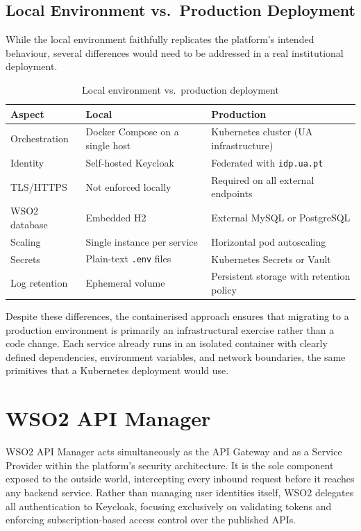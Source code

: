 \documentclass[12pt, a4paper]{report}
\begin{document}
\subsection{Local Environment vs.\ Production Deployment}
While the local environment faithfully replicates the platform's intended behaviour,
several differences would need to be addressed in a real institutional deployment.

\begin{table}[H]
    \centering
    \caption{Local environment vs.\ production deployment}
    \label{tab:local_vs_prod}
    \renewcommand{\arraystretch}{1.8}
    \begin{tabular}{p{3.5cm}p{5cm}p{5cm}}
        \toprule
        \textbf{Aspect} & \textbf{Local} & \textbf{Production} \\
        \midrule
        Orchestration   & Docker Compose on a single host  & Kubernetes cluster (UA infrastructure) \\
        Identity        & Self-hosted Keycloak             & Federated with \texttt{idp.ua.pt} \\
        TLS/HTTPS       & Not enforced locally             & Required on all external endpoints \\
        WSO2 database   & Embedded H2                      & External MySQL or PostgreSQL \\
        Scaling         & Single instance per service      & Horizontal pod autoscaling \\
        Secrets         & Plain-text \texttt{.env} files   & Kubernetes Secrets or Vault \\
        Log retention   & Ephemeral volume                 & Persistent storage with retention policy \\
        \bottomrule
    \end{tabular}
\end{table}

Despite these differences, the containerised approach ensures that migrating to a
production environment is primarily an infrastructural exercise rather than a code
change. Each service already runs in an isolated container with clearly defined
dependencies, environment variables, and network boundaries, the same primitives
that a Kubernetes deployment would use.


\section{WSO2 API Manager}
WSO2 API Manager acts simultaneously as the API Gateway and as a Service Provider within
the platform's security architecture. It is the sole component exposed to the outside
world, intercepting every inbound request before it reaches any backend service. Rather
than managing user identities itself, WSO2 delegates all authentication to Keycloak,
focusing exclusively on validating tokens and enforcing subscription-based access control
over the published APIs.
\end{document}
